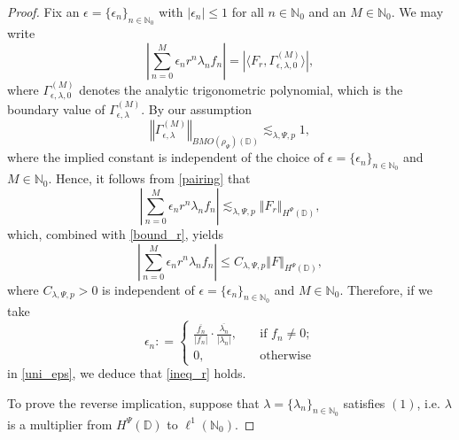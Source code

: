 \documentclass[a4paper, leqno, 10pt]{amsart}
\numberwithin{equation}{section}
\newcommand{\norm}[1]{\left\Vert#1\right\Vert}
\newcommand{\abs}[1]{\left|#1\right|}
\newcommand{\D}{\mathbb{D}}
\newcommand{\N}{\mathbb{N}}
\begin{document}
\begin{proof}
Fix an $\epsilon = \{ \epsilon_n \}_{n \in \N_0}$ with $|\epsilon_n| \leq 1$ for all $n \in \N_0$ and an $M \in \N_0$. We may write
\begin{equation}\label{pairing}
\abs{ \sum_{n=0}^M \epsilon_n r^n \lambda_n f_n   } = \abs{ \langle F_r ,  \Gamma_{\epsilon, \lambda, 0}^{(M)} \rangle }, 
\end{equation}
where $\Gamma_{\epsilon, \lambda, 0 }^{(M)} $ denotes the analytic trigonometric polynomial, which is the boundary value of $\Gamma_{\epsilon, \lambda}^{(M)} $.
By our assumption 
\[ 
\norm{ \Gamma_{\epsilon, \lambda}^{(M)} }_{BMO (\rho_{\Psi}) (\D)} \lesssim_{\lambda, \Psi, p} 1,
\]
where the implied constant is independent of the choice of $\epsilon = \{ \epsilon_n \}_{n \in \N_0}$ and $M \in \N_0$. Hence, it follows from \eqref{pairing} that
\[
\abs{ \sum_{n=0}^M \epsilon_n r^n  \lambda_n f_n }  \lesssim_{\lambda, \Psi, p} \norm{ F_r }_{H^{\Psi} (\D)}  ,
\]
which, combined with \eqref{bound_r}, yields
\begin{equation}\label{uni_eps}
\abs{ \sum_{n=0}^M \epsilon_n r^n  \lambda_n f_n   }  \leq C_{\lambda, \Psi, p} \norm{ F }_{H^{\Psi}   (\D)} ,
\end{equation}
where $C_{\lambda, \Psi, p} > 0$ is independent of $\epsilon = \{ \epsilon_n \}_{n \in \N_0}$ and $M \in \N_0$. Therefore, if we take
\[
\epsilon_n : =
\begin{cases}
 \frac{\overline{f_n}}{|f_n|} \cdot \frac{\overline{\lambda_n}}{|\lambda_n|} , \quad  & \text{if } f_n \neq 0; \\
0, \quad & \text{otherwise}  
\end{cases}
\]
in  \eqref{uni_eps}, we deduce that \eqref{ineq_r} holds. 


To prove the reverse implication, suppose that $\lambda = \{ \lambda_n  \}_{n \in \N_0}$ satisfies $(1)$, i.e. $\lambda$ is a multiplier from $H^{\Psi} (\D)$ to $\ell^1 (\N_0)$.
 

\end{proof}
\end{document}
